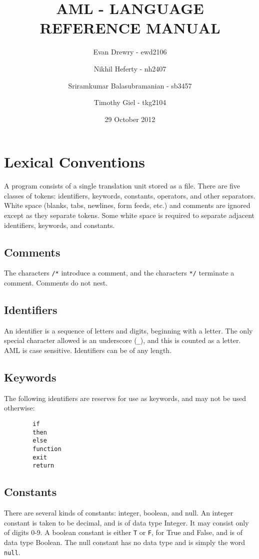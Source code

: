 \documentclass[12pt]{article}
\title{AML - LANGUAGE REFERENCE MANUAL}
\date{29 October 2012}
\author{
    Evan Drewry - ewd2106
    \and
    Nikhil Heferty - nh2407
    \and
    Sriramkumar Balasubramanian - sb3457
    \and
    Timothy Giel - tkg2104
}
\begin{document}
\maketitle


\section{Lexical Conventions}
A program consists of a single translation unit stored as a file. There are five classes of tokens: identifiers, keywords, constants, operators, and other separators. White space (blanks, tabs, newlines, form feeds, etc.) and comments are ignored except as they separate tokens. Some white space is required to separate adjacent identifiers, keywords, and constants.

\subsection{Comments}
The characters \lstinline$/*$ introduce a comment, and the characters \lstinline$*/$ terminate a comment. Comments do not nest.

\subsection{Identifiers}
An identifier is a sequence of letters and digits, beginning with a letter. The only special character allowed is an underscore (\lstinline{_}), and this is counted as a letter. AML is case sensitive. Identifiers can be of any length.

\subsection{Keywords}
The following identifiers are reserves for use as keywords, and may not be used otherwise:
\begin{lstlisting}
        if
        then
        else
        function
        exit
        return
\end{lstlisting}

\subsection{Constants}
There are several kinds of constants: integer, boolean, and null. An integer constant is taken to be decimal, and is of data type Integer. It may consist only of digits 0-9. A boolean constant is either \lstinline{T} or \lstinline{F}, for True and False, and is of data type Boolean. The null constant has no data type and is simply the word \lstinline{null}.
\end{document}
